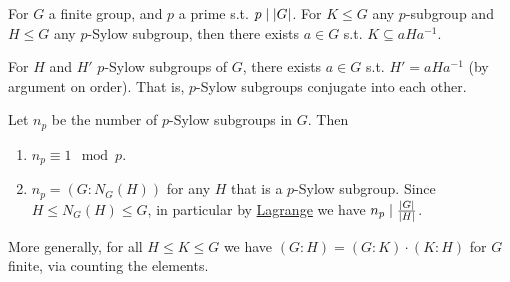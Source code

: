 \begin{theorem}[Sylow II]\label{thm: Sylow II}
    For $G$ a finite group, and $p$ a prime s.t. $p \mid \left|G\right|$. For $K \leq G$ any $p$-subgroup and $H \leq G$ any $p$-Sylow subgroup, then there exists $a \in G$ s.t. $K \subseteq aHa^{-1}$.
\end{theorem}

\begin{corollary}\label{cor: p-sylow conjugates into each other}
    For $H$ and $H'$ $p$-Sylow subgroups of $G$, there exists $a \in G$ s.t. $H' = aHa^{-1}$ (by argument on order). That is, $p$-Sylow subgroups conjugate into each other.
\end{corollary}

\begin{theorem}\label{thm: Sylow III}
    Let $n_p$ be the number of $p$-Sylow subgroups in $G$. Then
    \begin{enumerate}[label=\arabic*)]
        \item $n_p \equiv 1 \mod{p}$.
        \item $n_p = (G: N_G(H))$ for any $H$ that is a $p$-Sylow subgroup. Since $H \leq N_G(H) \leq G$, in particular by \hyperref[thm: Lagrange]{Lagrange} we have $n_p \mid \frac{\left|G\right|}{\left|H\right|}$.
    \end{enumerate}
\end{theorem}

\begin{remark}
    More generally, for all $H \leq K \leq G$ we have $(G : H) = (G : K) \cdot (K : H)$ for $G$ finite, via counting the elements.
\end{remark}

